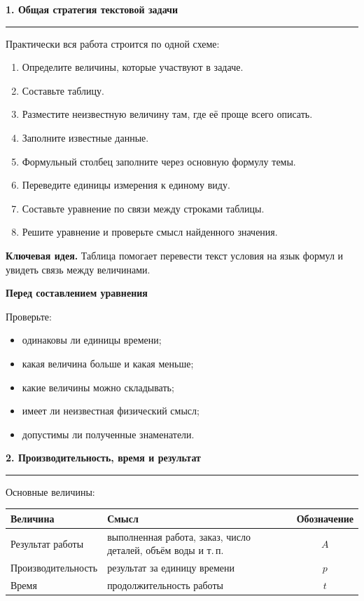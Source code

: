 \documentclass[a4paper,12pt]{article}
\newcommand{\topic}[1]{%
    \vspace{0.5em}
    {\Large\bfseries\color{darkaccent}#1}\par
    \vspace{0.25em}
    {\color{accent!55}\rule{\linewidth}{0.6pt}}\par
    \vspace{0.45em}
}
\newcommand{\subtopic}[1]{%
    \vspace{0.4em}
    {\large\bfseries\color{darkaccent}#1}\par
    \vspace{0.15em}
}
\newcommand{\keyidea}[1]{%
    \textbf{\color{darkaccent}Ключевая идея.} #1
}
\begin{document}

\topic{1. Общая стратегия текстовой задачи}

Практически вся работа строится по одной схеме:

\begin{enumerate}
    \item Определите величины, которые участвуют в задаче.
    \item Составьте таблицу.
    \item Разместите неизвестную величину там, где её проще всего описать.
    \item Заполните известные данные.
    \item Формульный столбец заполните через основную формулу темы.
    \item Переведите единицы измерения к единому виду.
    \item Составьте уравнение по связи между строками таблицы.
    \item Решите уравнение и проверьте смысл найденного значения.
\end{enumerate}

\keyidea{Таблица помогает перевести текст условия на язык формул и увидеть связь между величинами.}

\subtopic{Перед составлением уравнения}

Проверьте:

\begin{itemize}
    \item одинаковы ли единицы времени;
    \item какая величина больше и какая меньше;
    \item какие величины можно складывать;
    \item имеет ли неизвестная физический смысл;
    \item допустимы ли полученные знаменатели.
\end{itemize}


\topic{2. Производительность, время и результат}

Основные величины:

\begin{center}
\renewcommand{\arraystretch}{1.35}
\begin{tabularx}{0.88\linewidth}{@{} l X c @{}}
\toprule
\textbf{Величина} & \textbf{Смысл} & \textbf{Обозначение} \\
\midrule
Результат работы & выполненная работа, заказ, число деталей, объём воды и т.\,п. & $A$ \\
Производительность & результат за единицу времени & $p$ \\
Время & продолжительность работы & $t$ \\
\bottomrule
\end{tabularx}
\end{center}
\end{document}

